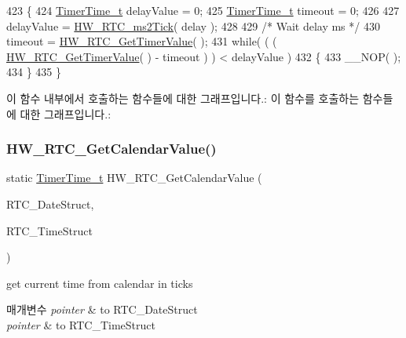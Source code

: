\begin{DoxyCode}
423 \{
424   \mbox{\hyperlink{utilities_8h_a4215ca43d3e953099ea758ce428599d0}{TimerTime\_t}} delayValue = 0;
425   \mbox{\hyperlink{utilities_8h_a4215ca43d3e953099ea758ce428599d0}{TimerTime\_t}} timeout = 0;
426 
427   delayValue = \mbox{\hyperlink{group___lory_s_d_k___r_t_c___functions_gab105bfcf0c8b346a1b20b158b8f8a86e}{HW\_RTC\_ms2Tick}}( delay );
428 
429   \textcolor{comment}{/* Wait delay ms */}
430   timeout = \mbox{\hyperlink{group___lory_s_d_k___r_t_c___functions_gad0d80bf1ac3a9704f4b4b9d672f38daa}{HW\_RTC\_GetTimerValue}}( );
431   \textcolor{keywordflow}{while}( ( ( \mbox{\hyperlink{group___lory_s_d_k___r_t_c___functions_gad0d80bf1ac3a9704f4b4b9d672f38daa}{HW\_RTC\_GetTimerValue}}( ) - timeout ) ) < delayValue )
432   \{
433     \_\_NOP( );
434   \}
435 \}
\end{DoxyCode}
이 함수 내부에서 호출하는 함수들에 대한 그래프입니다.\+:
이 함수를 호출하는 함수들에 대한 그래프입니다.\+:
\mbox{\label{group___lory_s_d_k___r_t_c___functions_gaf81b8dc866a5c7b125355b55e3953387}} 
\subsubsection{\texorpdfstring{H\+W\+\_\+\+R\+T\+C\+\_\+\+Get\+Calendar\+Value()}{HW\_RTC\_GetCalendarValue()}}
{\footnotesize\ttfamily static \mbox{\hyperlink{utilities_8h_a4215ca43d3e953099ea758ce428599d0}{Timer\+Time\+\_\+t}} H\+W\+\_\+\+R\+T\+C\+\_\+\+Get\+Calendar\+Value (\begin{DoxyParamCaption}\item[{R\+T\+C\+\_\+\+Date\+Type\+Def $\ast$}]{R\+T\+C\+\_\+\+Date\+Struct,  }\item[{R\+T\+C\+\_\+\+Time\+Type\+Def $\ast$}]{R\+T\+C\+\_\+\+Time\+Struct }\end{DoxyParamCaption})\hspace{0.3cm}{\ttfamily [static]}}



get current time from calendar in ticks 


\begin{DoxyParams}{매개변수}
{\em pointer} & to R\+T\+C\+\_\+\+Date\+Struct \\
\hline
{\em pointer} & to R\+T\+C\+\_\+\+Time\+Struct \\
\hline
\end{DoxyParams}

